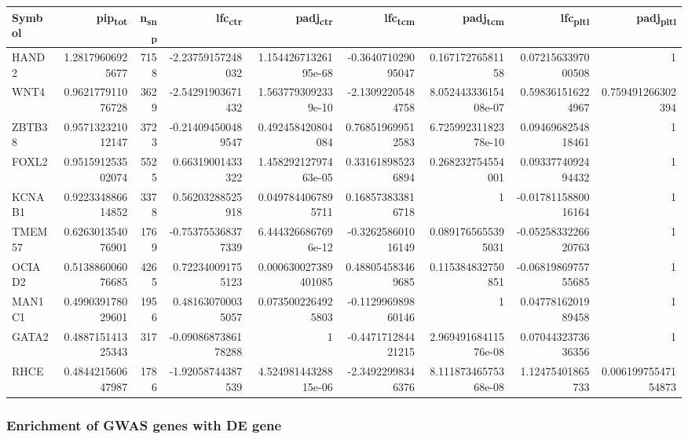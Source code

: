 \begin{center}
\begin{tabular}{lrrrrrrrr}
Symbol & pip\textsubscript{tot} & n\textsubscript{snp} & lfc\textsubscript{ctr} & padj\textsubscript{ctr} & lfc\textsubscript{tcm} & padj\textsubscript{tcm} & lfc\textsubscript{pltl} & padj\textsubscript{pltl}\\
\hline
HAND2 & 1.28179606925677 & 7158 & -2.23759157248032 & 1.15442671326195e-68 & -0.364071029095047 & 0.16717276581158 & 0.0721563397000508 & 1\\
WNT4 & 0.962177911076728 & 3629 & -2.54291903671432 & 1.5637793092339e-10 & -2.13092205484758 & 8.05244333615408e-07 & 0.598361516224967 & 0.759491266302394\\
ZBTB38 & 0.957132321012147 & 3723 & -0.214094500489547 & 0.492458420804084 & 0.768519699512583 & 6.72599231182378e-10 & 0.0946968254818461 & 1\\
FOXL2 & 0.951591253502074 & 5525 & 0.66319001433322 & 1.45829212797463e-05 & 0.331618985236894 & 0.268232754554001 & 0.0933774092494432 & 1\\
KCNAB1 & 0.922334886614852 & 3378 & 0.56203288525918 & 0.0497844067895711 & 0.168573833816718 & 1 & -0.0178115880016164 & 1\\
TMEM57 & 0.626301354076901 & 1769 & -0.753755368377339 & 6.4443266867696e-12 & -0.326258601016149 & 0.0891765655395031 & -0.0525833226620763 & 1\\
OCIAD2 & 0.513886006076685 & 4265 & 0.722340091755123 & 0.000630027389401085 & 0.488054583469685 & 0.115384832750851 & -0.0681986975755685 & 1\\
MAN1C1 & 0.499039178029601 & 1956 & 0.481630700035057 & 0.0735002264925803 & -0.112996989860146 & 1 & 0.0477816201989458 & 1\\
GATA2 & 0.488715141325343 & 317 & -0.0908687386178288 & 1 & -0.447171284421215 & 2.96949168411576e-08 & 0.0704432373636356 & 1\\
RHCE & 0.484421560647987 & 1786 & -1.92058744387539 & 4.52498144328815e-06 & -2.34922998346376 & 8.11187346575368e-08 & 1.12475401865733 & 0.00619975547154873\\
\end{tabular}
\end{center}





\subsubsection*{Enrichment of GWAS genes with DE gene}
\label{sec:org087a07a}

